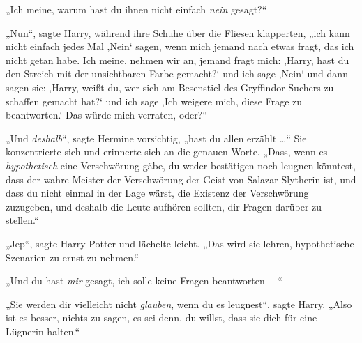 „Ich meine, warum hast du ihnen nicht einfach \emph{nein} gesagt?“

„Nun“, sagte Harry, während ihre Schuhe über die Fliesen klapperten, „ich kann nicht einfach jedes Mal ‚Nein‘ sagen, wenn mich jemand nach etwas fragt, das ich nicht getan habe. Ich meine, nehmen wir an, jemand fragt mich: ‚Harry, hast du den Streich mit der unsichtbaren Farbe gemacht?‘ und ich sage ‚Nein‘ und dann sagen sie: ‚Harry, weißt du, wer sich am Besenstiel des Gryffindor-Suchers zu schaffen gemacht hat?‘ und ich sage ‚Ich weigere mich, diese Frage zu beantworten.‘ Das würde mich verraten, oder?“

„Und \emph{deshalb}“, sagte Hermine vorsichtig, „hast du allen erzählt …“ Sie konzentrierte sich und erinnerte sich an die genauen Worte.
„Dass, wenn es \emph{hypothetisch} eine Verschwörung gäbe, du weder bestätigen noch leugnen könntest, dass der wahre Meister der Verschwörung der Geist von Salazar Slytherin ist, und dass du nicht einmal in der Lage wärst, die Existenz der Verschwörung zuzugeben, und deshalb die Leute aufhören sollten, dir Fragen darüber zu stellen.“

„Jep“, sagte Harry Potter und lächelte leicht.
„Das wird sie lehren, hypothetische Szenarien zu ernst zu nehmen.“

„Und du hast \emph{mir} gesagt, ich solle keine Fragen beantworten —“

„Sie werden dir vielleicht nicht \emph{glauben}, wenn du es leugnest“, sagte Harry.
„Also ist es besser, nichts zu sagen, es sei denn, du willst, dass sie dich für eine Lügnerin halten.“

